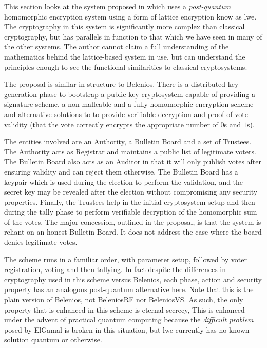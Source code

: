 This section looks at the system proposed in \cite{chillottiHomomorphicLWEBased} which uses a \emph{post-quantum} homomorphic encryption system using a form of lattice encryption know as \gls{lwe}. The cryptography in this system is significantly more complex than classical cryptography, but has parallels in function to that which we have seen in many of the other systems. The author cannot claim a full understanding of the mathematics behind the lattice-based system in use, but can understand the principles enough to see the functional similarities to classical cryptosystems.

The proposal is similar in structure to Belenios. There is a distributed key-generation phase to bootstrap a public key cryptosystem capable of providing a signature scheme, a non-malleable and a fully homomorphic encryption scheme and alternative solutions to  to provide verifiable decryption and proof of vote validity (that the vote correctly encrypts the appropriate number of $0$s and $1$s).

The entities involved are an Authority, a Bulletin Board and a set of Trustees. The Authority acts as Registrar and maintains a public list of legitimate voters. The Bulletin Board also acts as an Auditor in that it will only publish votes after ensuring validity and can reject them otherwise. The Bulletin Board has a keypair which is used during the election to perform the validation, and the secret key may be revealed after the election without compromising any security properties. Finally, the Trustees help in the initial cryptosystem setup and then during the tally phase to perform verifiable decryption of the homomorphic sum of the votes. The major concession, outlined in the proposal, is that the system is reliant on an honest Bulletin Board. It does not address the case where the board denies legitimate votes.

The scheme runs in a familiar order, with parameter setup, followed by voter registration, voting and then tallying. In fact despite the differences in cryptography used in this scheme versus Belenios, each phase, action and security property has an analogous post-quantum alternative here. Note that this is the plain version of Belenios, not BeleniosRF nor BeleniosVS. As such, the only property that is enhanced in this scheme is eternal secrecy, This is enhanced under the advent of practical quantum computing because the \emph{difficult problem} posed by ElGamal is broken in this situation, but \gls{lwe} currently has no known solution quantum or otherwise.

